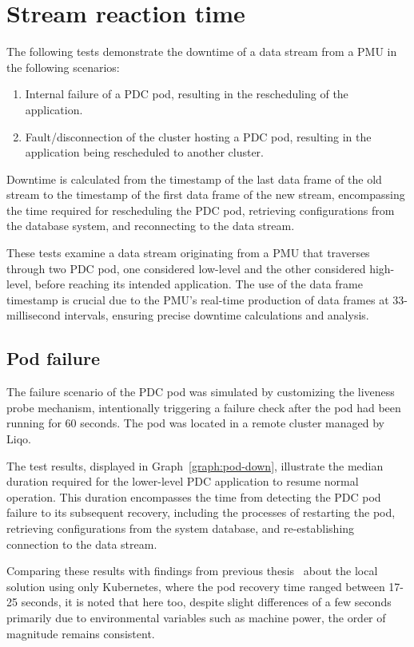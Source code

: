 \section{Stream reaction time}
The following tests demonstrate the downtime of a data stream from a PMU in the following scenarios:

\begin{enumerate}
\item Internal failure of a PDC pod, resulting in the rescheduling of the application. 
\item Fault/disconnection of the cluster hosting a PDC pod, resulting in the application being rescheduled to another cluster.
\end{enumerate}

Downtime is calculated from the timestamp of the last data frame of the old stream to the timestamp of the first data frame of the new stream, encompassing the time required for rescheduling the PDC pod, retrieving configurations from the database system, and reconnecting to the data stream.

These tests examine a data stream originating from a PMU that traverses through two PDC pod, one considered low-level and the other considered high-level, before reaching its intended application. The use of the data frame timestamp is crucial due to the PMU's real-time production of data frames at 33-millisecond intervals, ensuring precise downtime calculations and analysis.

\subsection{Pod failure}
The failure scenario of the PDC pod was simulated by customizing the liveness probe mechanism, intentionally triggering a failure check after the pod had been running for 60 seconds. The pod was located in a remote cluster managed by Liqo.

The test results, displayed in Graph~\ref{graph:pod-down}, illustrate the median duration required for the lower-level PDC application to resume normal operation. This duration encompasses the time from detecting the PDC pod failure to its subsequent recovery, including the processes of restarting the pod, retrieving configurations from the system database, and re-establishing connection to the data stream.

Comparing these results with findings from previous thesis~\cite{e3-1} about the local solution using only Kubernetes,  where the pod recovery time ranged between 17-25 seconds, it is noted that here too, despite slight differences of a few seconds primarily due to environmental variables such as machine power, the order of magnitude remains consistent. 

